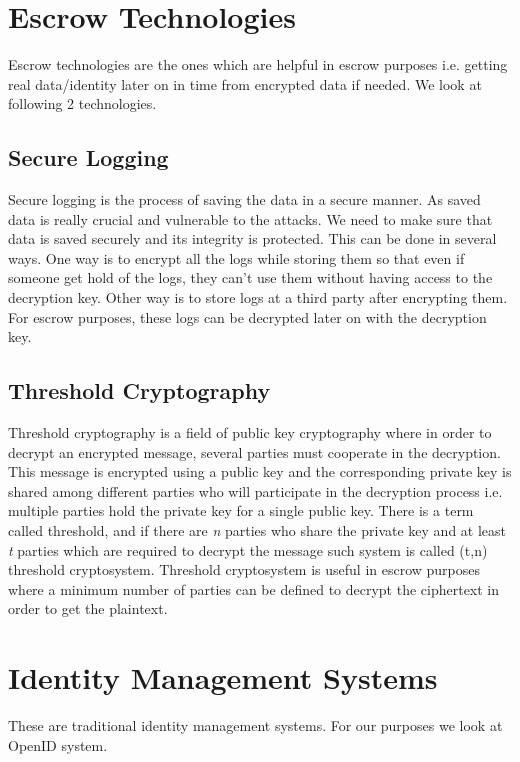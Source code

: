 \section{Escrow Technologies}
Escrow technologies are the ones which are helpful in escrow purposes i.e. getting real data/identity later on in time from encrypted data if needed. We look at following 2 technologies.
\subsection{Secure Logging}
Secure logging is the process of saving the data in a secure manner. As saved data is really crucial and vulnerable to the attacks. We need to make sure that data is saved securely and its integrity is protected. This can be done in several ways. One way is to encrypt all the logs while storing them so that even if someone get hold of the logs, they can't use them without having access to the decryption key. Other way is to store logs at a third party after encrypting them. For escrow purposes, these logs can be decrypted later on with the decryption key.
\subsection{Threshold Cryptography}
Threshold cryptography is a field of public key cryptography where in order to decrypt an encrypted message, several parties must cooperate in the decryption. This message is encrypted using a public key and the corresponding private key is shared among different parties who will participate in the decryption process i.e. multiple parties hold the private key for a single public key. There is a term called threshold, and if there are \textit{n} parties who share the private key and at least \textit{t} parties which are required to decrypt the message such system is called (t,n) threshold cryptosystem. Threshold cryptosystem is useful in escrow purposes where a minimum number of parties can be defined to decrypt the ciphertext in order to get the plaintext.

\section{Identity Management Systems}
These are traditional identity management systems. For our purposes we look at OpenID system.
